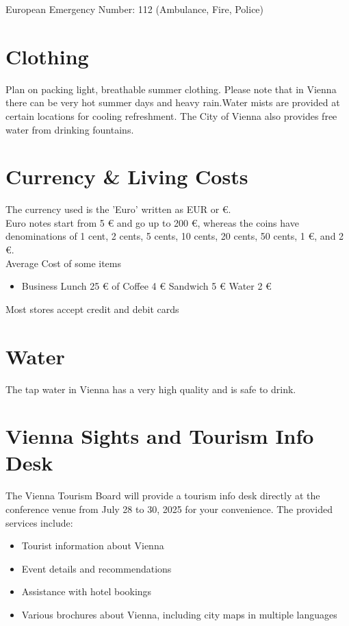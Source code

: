 European Emergency Number: 112 (Ambulance, Fire, Police)

\section*{Clothing}

Plan on packing light, breathable summer clothing. Please note that in Vienna there can be very hot summer days and heavy rain.Water mists are provided at certain locations for cooling refreshment. The City of Vienna also provides free water from drinking fountains.

\section*{Currency \& Living Costs}

The currency used is the 'Euro’ written as EUR or €.\\

Euro notes start from 5 € and go up to 200 €, whereas the coins have denominations of 1 cent, 2 cents, 5 cents, 10 cents, 20 cents, 50 cents, 1 €, and 2 €.\\

Average Cost of some items
\begin{itemize}
\item Business Lunch  25 €
\itemCup of Coffee  4 €
\itemFilled Sandwich  5 €
\itemMineral Water  2 €
\end{itemize}

Most stores accept credit and debit cards

\section*{Water}
The tap water in Vienna has a very high quality and is safe to drink.

\section*{Vienna Sights and Tourism Info Desk}

The Vienna Tourism Board will provide a tourism info desk directly at the conference venue from July 28 to 30, 2025 for your convenience. The provided services include:

\begin{itemize}

\item Tourist information about Vienna
\item Event details and recommendations
\item Assistance with hotel bookings
\item Various brochures about Vienna, including city maps in multiple languages

\end{itemize}

